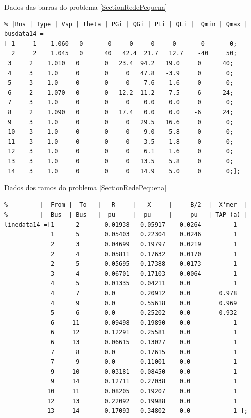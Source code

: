 Dados das barras do problema \ref{SectionRedePequena}
\begin{verbatim}
% |Bus | Type | Vsp | theta | PGi | QGi | PLi | QLi |  Qmin | Qmax |
busdata14 = 
[ 1     1    1.060   0       0     0     0     0       0       0;
  2     2    1.045   0      40   42.4  21.7   12.7    -40     50;
 3     2    1.010   0       0   23.4  94.2   19.0     0      40;
 4     3    1.0     0       0     0   47.8   -3.9     0       0;
 5     3    1.0     0       0     0    7.6    1.6     0       0;
 6     2    1.070   0       0   12.2  11.2    7.5    -6      24;
 7     3    1.0     0       0     0    0.0    0.0     0       0;
 8     2    1.090   0       0   17.4   0.0    0.0    -6      24;
 9     3    1.0     0       0     0   29.5   16.6     0       0;
 10    3    1.0     0       0     0    9.0    5.8     0       0;
 11    3    1.0     0       0     0    3.5    1.8     0       0;
 12    3    1.0     0       0     0    6.1    1.6     0       0;
 13    3    1.0     0       0     0   13.5    5.8     0       0;
 14    3    1.0     0       0     0   14.9    5.0     0       0;];
\end{verbatim}
Dados dos ramos do problema \ref{SectionRedePequena}
\begin{verbatim}
%         |  From |  To   |   R     |   X     |     B/2  |  X'mer  |
%         |  Bus  | Bus   |  pu     |  pu     |     pu   | TAP (a) |
linedata14 =[1      2       0.01938   0.05917    0.0264         1
             1      5       0.05403   0.22304    0.0246         1
             2      3       0.04699   0.19797    0.0219         1
             2      4       0.05811   0.17632    0.0170         1
             2      5       0.05695   0.17388    0.0173         1
             3      4       0.06701   0.17103    0.0064         1
             4      5       0.01335   0.04211    0.0            1
             4      7       0.0       0.20912    0.0        0.978
             4      9       0.0       0.55618    0.0        0.969
             5      6       0.0       0.25202    0.0        0.932
             6     11       0.09498   0.19890    0.0            1
             6     12       0.12291   0.25581    0.0            1
             6     13       0.06615   0.13027    0.0            1
             7      8       0.0       0.17615    0.0            1
             7      9       0.0       0.11001    0.0            1
             9     10       0.03181   0.08450    0.0            1
             9     14       0.12711   0.27038    0.0            1
            10     11       0.08205   0.19207    0.0            1
            12     13       0.22092   0.19988    0.0            1
            13     14       0.17093   0.34802    0.0            1 ];
\end{verbatim}

